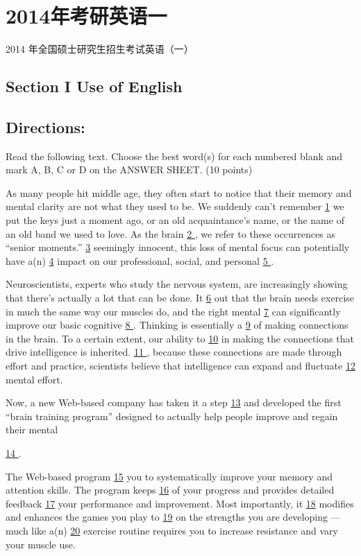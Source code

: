 \documentclass[UTF8,11pt]{ctexart}
\begin{document}
\section*{2014年考研英语一}
2014 年全国硕士研究生招生考试英语（一）


\subsection*{\textbf{Section I Use of English}}


\subsection*{\textbf{Directions:}}


Read the following text. Choose the best word(s) for each numbered blank and mark A, B, C or D on the ANSWER SHEET. (10 points)


As many people hit middle age, they often start to notice that their memory and mental clarity are not what they used to be. We suddenly can’t remember \uline{1} we put the keys just a moment ago, or an old acquaintance’s name, or the name of an old band we used to love. As the brain \uline{2 }, we refer to these occurrences as “senior moments.” \uline{3} seemingly innocent, this loss of mental focus can potentially have a(n) \uline{4} impact on our professional, social, and personal \uline{5 }.


Neuroscientists, experts who study the nervous system, are increasingly showing that there’s actually a lot that can be done. It \uline{6} out that the brain needs exercise in much the same way our muscles do, and the right mental \uline{7} can significantly improve our basic cognitive \uline{8 }. Thinking is essentially a \uline{9} of making connections in the brain. To a certain extent, our ability to \uline{10} in making the connections that drive intelligence is inherited. \uline{11 }, because these connections are made through effort and practice, scientists believe that intelligence can expand and fluctuate \uline{12} mental effort.


Now, a new Web-based company has taken it a step \uline{13} and developed the first “brain training program” designed to actually help people improve and regain their mental


\uline{14 }.


The Web-based program \uline{15} you to systematically improve your memory and attention skills. The program keeps \uline{16} of your progress and provides detailed feedback \uline{17} your performance and improvement. Most importantly, it \uline{18} modifies and enhances the games you play to \uline{19} on the strengths you are developing — much like a(n) \uline{20} exercise routine requires you to increase resistance and vary your muscle use.
\end{document}
